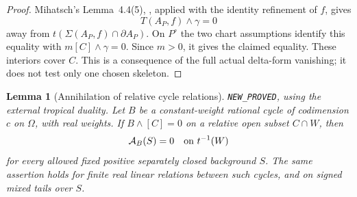 \documentclass[11pt,a4paper]{article}
\numberwithin{equation}{section}
\newtheorem{lemma}[theorem]{Lemma}
\theoremstyle{definition}
\theoremstyle{remark}
\begin{document}
\begin{proof}
Mihatsch's Lemma~4.4(5), \cite[printed p.~62]{Mih24}, applied with the
identity refinement of $f$, gives
\[
                    T(A_P,f)\wedge\gamma=0
\]
away from $t(\Sigma(A_P,f)\cap\partial A_P)$.  On $P^\circ$ the
two chart assumptions identify this equality with
$m[C]\wedge\gamma=0$.  Since $m>0$, it gives the claimed equality.
These interiors cover $C$.  This is a consequence of the full actual
delta-form vanishing; it does not test only one chosen skeleton.
\end{proof}

\begin{lemma}[Annihilation of relative cycle relations]
\label{lem:r6-matroidal-cycle-relation}
\textnormal{\texttt{NEW\_PROVED}}, using the external tropical duality.
Let $B$ be a constant-weight rational cycle of codimension $c$ on
$\Omega$, with real weights.  If $B\wedge[C]=0$ on a relative open
subset $C\cap W$, then
\[
                           \mathcal A_B(S)=0
                       \quad\hbox{on }t^{-1}(W)
\]
for every allowed fixed positive separately closed background $S$.
The same assertion holds for finite real linear relations between
such cycles, and on signed mixed tails over $S$.
\end{lemma}
\end{document}
